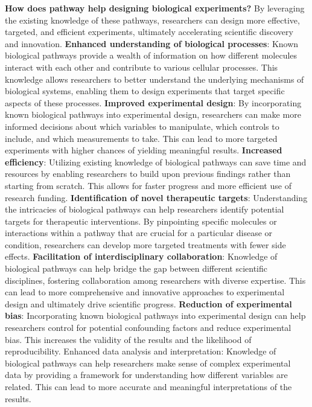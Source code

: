 \textbf{How does pathway help designing biological experiments?} By leveraging the existing knowledge of these pathways, researchers can design more effective, targeted, and efficient experiments, ultimately accelerating scientific discovery and innovation. \textbf{Enhanced understanding of biological processes}: Known biological pathways provide a wealth of information on how different molecules interact with each other and contribute to various cellular processes. This knowledge allows researchers to better understand the underlying mechanisms of biological systems, enabling them to design experiments that target specific aspects of these processes. \textbf{Improved experimental design}: By incorporating known biological pathways into experimental design, researchers can make more informed decisions about which variables to manipulate, which controls to include, and which measurements to take. This can lead to more targeted experiments with higher chances of yielding meaningful results. \textbf{Increased efficiency}: Utilizing existing knowledge of biological pathways can save time and resources by enabling researchers to build upon previous findings rather than starting from scratch. This allows for faster progress and more efficient use of research funding. \textbf{Identification of novel therapeutic targets}: Understanding the intricacies of biological pathways can help researchers identify potential targets for therapeutic interventions. By pinpointing specific molecules or interactions within a pathway that are crucial for a particular disease or condition, researchers can develop more targeted treatments with fewer side effects. \textbf{Facilitation of interdisciplinary collaboration}: Knowledge of biological pathways can help bridge the gap between different scientific disciplines, fostering collaboration among researchers with diverse expertise. This can lead to more comprehensive and innovative approaches to experimental design and ultimately drive scientific progress. \textbf{Reduction of experimental bias}: Incorporating known biological pathways into experimental design can help researchers control for potential confounding factors and reduce experimental bias. This increases the validity of the results and the likelihood of reproducibility. {Enhanced data analysis and interpretation}: Knowledge of biological pathways can help researchers make sense of complex experimental data by providing a framework for understanding how different variables are related. This can lead to more accurate and meaningful interpretations of the results.

